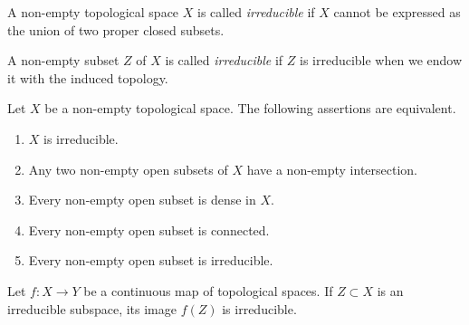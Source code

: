 \begin{definition}
  \label{def:irreducible-topological-spaces}
  A non-empty topological space $X$ is called \textit{irreducible} if
  $X$ cannot be expressed as the union of two proper closed subsets.

  A non-empty subset $Z$ of $X$ is called \textit{irreducible} if $Z$ is irreducible when we endow it with the induced topology.
\end{definition}

\begin{proposition}
  \label{prop:characterization-of-irreducible-topological-spaces}
  Let $X$ be a non-empty topological space. The following assertions
  are equivalent.
  \begin{enumerate}[label=(\roman*)]
  \item $X$ is irreducible.
  \item Any two non-empty open subsets of $X$ have a non-empty intersection.
  \item Every non-empty open subset is dense in $X$.
  \item Every non-empty open subset is connected.
  \item Every non-empty open subset is irreducible.
  \end{enumerate}
\end{proposition}

\begin{corollary}
  \label{cor:maps-from-irreducible-sets}
  Let $f \colon X \rightarrow Y$ be a continuous map of topological spaces. If $Z \subset X$ is an irreducible subspace, its image $f (Z)$ is irreducible.
\end{corollary}

